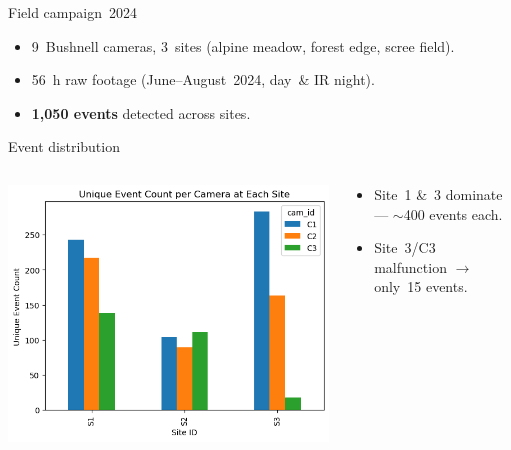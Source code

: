 \documentclass[aspectratio=169,xcolor=dvipsnames,t]{beamer}
\begin{document}

\begin{frame}{Field campaign 2024}
  \begin{itemize}
    \item 9 Bushnell cameras, 3 sites (alpine meadow, forest edge, scree field).
    \item 56 h raw footage (June–August 2024, day \& IR night).
    \item \textbf{1,050 events} detected across sites.
  \end{itemize}
\end{frame}

\begin{frame}{Event distribution}
  \begin{columns}[T]
    \begin{column}{0.55\linewidth}
      \includegraphics[width=\linewidth]{figs/raw/event_count_per_camera.png}
    \end{column}
    \begin{column}{0.45\linewidth}
      \small
      \begin{itemize}
        \item Site 1 \& 3 dominate — $\sim$400 events each.
        \item Site 3/C3 malfunction $\rightarrow$ only 15 events.
      \end{itemize}
    \end{column}
  \end{columns}
\end{frame}
\end{document}
